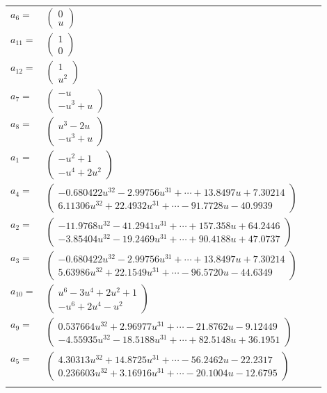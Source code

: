 \documentclass[1p]{elsarticle_modified}
\theoremstyle{definition}
\begin{document}
\begin{tabular}{m{7pt} m{180pt} m{7pt} m{180pt} }
\flushright $a_{6}=$&$\begin{pmatrix}0\\u\end{pmatrix}$ \\
\flushright $a_{11}=$&$\begin{pmatrix}1\\0\end{pmatrix}$ \\
\flushright $a_{12}=$&$\begin{pmatrix}1\\u^2\end{pmatrix}$ \\
\flushright $a_{7}=$&$\begin{pmatrix}- u\\- u^3+u\end{pmatrix}$ \\
\flushright $a_{8}=$&$\begin{pmatrix}u^3-2 u\\- u^3+u\end{pmatrix}$ \\
\flushright $a_{1}=$&$\begin{pmatrix}- u^2+1\\- u^4+2 u^2\end{pmatrix}$ \\
\flushright $a_{4}=$&$\begin{pmatrix}-0.680422 u^{32}-2.99756 u^{31}+\cdots+13.8497 u+7.30214\\6.11306 u^{32}+22.4932 u^{31}+\cdots-91.7728 u-40.9939\end{pmatrix}$ \\
\flushright $a_{2}=$&$\begin{pmatrix}-11.9768 u^{32}-41.2941 u^{31}+\cdots+157.358 u+64.2446\\-3.85404 u^{32}-19.2469 u^{31}+\cdots+90.4188 u+47.0737\end{pmatrix}$ \\
\flushright $a_{3}=$&$\begin{pmatrix}-0.680422 u^{32}-2.99756 u^{31}+\cdots+13.8497 u+7.30214\\5.63986 u^{32}+22.1549 u^{31}+\cdots-96.5720 u-44.6349\end{pmatrix}$ \\
\flushright $a_{10}=$&$\begin{pmatrix}u^6-3 u^4+2 u^2+1\\- u^6+2 u^4- u^2\end{pmatrix}$ \\
\flushright $a_{9}=$&$\begin{pmatrix}0.537664 u^{32}+2.96977 u^{31}+\cdots-21.8762 u-9.12449\\-4.55935 u^{32}-18.5188 u^{31}+\cdots+82.5148 u+36.1951\end{pmatrix}$ \\
\flushright $a_{5}=$&$\begin{pmatrix}4.30313 u^{32}+14.8725 u^{31}+\cdots-56.2462 u-22.2317\\0.236603 u^{32}+3.16916 u^{31}+\cdots-20.1004 u-12.6795\end{pmatrix}$\\&\end{tabular}
\end{document}
